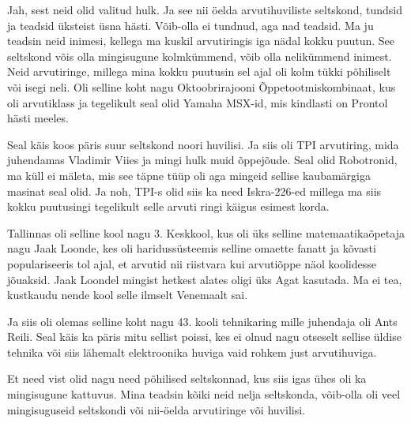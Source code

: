 
Jah, sest neid olid valitud hulk. Ja see nii öelda arvutihuviliste seltskond, tundsid ja teadsid üksteist üsna hästi. Võib-olla ei tundnud, aga nad teadsid. Ma ju teadsin neid inimesi, kellega ma kuskil arvutiringis iga nädal kokku puutun. See seltskond võis olla mingisugune kolmkümmend, võib olla nelikümmend inimest. Neid arvutiringe,  millega mina kokku puutusin sel ajal oli kolm tükki põhiliselt või isegi neli. Oli selline koht nagu Oktoobrirajooni Õppetootmiskombinaat, kus oli arvutiklass ja tegelikult seal olid Yamaha MSX-id, mis kindlasti on Prontol hästi meeles. 

Seal käis koos päris suur seltskond noori huvilisi. Ja siis oli TPI arvutiring, mida juhendamas Vladimir Viies ja mingi hulk muid õppejõude. Seal olid Robotronid, ma küll ei mäleta, mis see täpne tüüp oli aga mingeid  sellise kaubamärgiga masinat seal olid. Ja noh, TPI-s olid siis ka need Iskra-226-ed millega ma siis kokku puutusingi tegelikult selle arvuti ringi käigus esimest korda. 

Tallinnas oli selline kool nagu 3. Keskkool, kus oli üks selline matemaatikaõpetaja nagu Jaak Loonde, kes oli haridussüsteemis selline omaette fanatt ja kõvasti populariseeris tol ajal, et arvutid nii riistvara kui arvutiõppe näol koolidesse jõuaksid. Jaak Loondel  mingist hetkest alates oligi üks Agat kasutada. Ma ei tea, kustkaudu nende kool selle ilmselt Venemaalt sai. 

Ja siis oli olemas selline koht nagu 43. kooli tehnikaring mille juhendaja oli Ants Reili. Seal käis ka päris mitu sellist poissi, kes ei olnud nagu otseselt sellise üldise tehnika või siis lähemalt elektroonika huviga vaid rohkem  just arvutihuviga.

Et need vist olid nagu need põhilised seltskonnad, kus siis igas ühes oli  ka mingisugune kattuvus. Mina teadsin  kõiki neid nelja seltskonda, võib-olla oli veel mingisuguseid seltskondi või nii-öelda arvutiringe või huvilisi.


